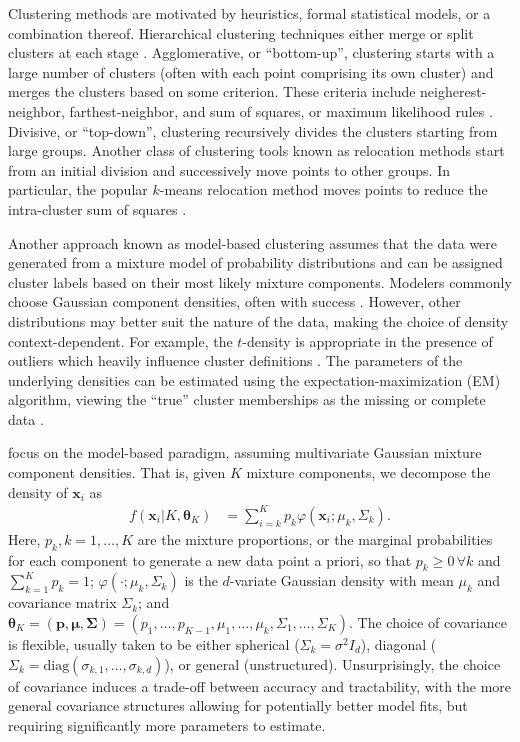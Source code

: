 \documentclass{uwstat572}
\newcommand*\ba{\[ \begin{aligned}}
\newcommand*\ea{\end{aligned} \]}
\newcommand*\bp{\mathbf{p}}
\newcommand*\bx{\mathbf{x}}
\newcommand*\btheta{\boldsymbol{\theta}}
\newcommand*\bmu{\boldsymbol{\mu}}
\newcommand*\bSigma{\boldsymbol{\Sigma}}
\renewcommand\;{\,}
\renewcommand\phi{\varphi}
\begin{document}
Clustering methods are motivated by heuristics, formal statistical models, or a combination thereof.
Hierarchical clustering techniques either merge or split clusters at each stage \citep{Fraley98}.
Agglomerative, or ``bottom-up'', clustering starts with a large number of clusters (often with each point comprising its own cluster) and merges the clusters based on some criterion.
These criteria include neigherest-neighbor, farthest-neighbor, and sum of squares, or maximum likelihood rules \citep{Kaufman90, Murtagh84, Banfield93}.
Divisive, or ``top-down'', clustering recursively divides the clusters starting from large groups. 
Another class of clustering tools known as relocation methods start from an initial division and successively move points to other groups.
In particular, the popular $k$-means relocation method moves points to reduce the intra-cluster sum of squares \citep{Hartigan78}. 



Another approach known as model-based clustering assumes that the data were generated from a mixture model of probability distributions and can be assigned cluster labels based on their most likely mixture components.
Modelers commonly choose Gaussian component densities, often with success \citep{Murtagh84, Banfield93, Dasgupta98, Campbell97, Celeux95, Mukerjee98}.
However, other distributions may better suit the nature of the data, making the choice of density context-dependent.
For example, the $t$-density is appropriate in the presence of outliers which heavily influence cluster definitions \citep{Peel00}.
The parameters of the underlying densities can be estimated using the expectation-maximization (EM) algorithm, viewing the ``true'' cluster memberships as the missing or complete data \citep{McLachlan88, Dempster77}. 


\cite{Baudry10} focus on the model-based paradigm, assuming multivariate Gaussian mixture component densities. 
That is, given $K$ mixture components, we decompose the density of $\bx_i$ as
\ba
f(\bx_i | K, \btheta_K)
	& = \sum_{i=k}^K p_k \phi \left(\bx_i ; \mu_k, \Sigma_k \right).
\ea
Here, $p_k, k = 1, \dotsc, K$ are the mixture proportions, or the marginal probabilities for each component to generate a new data point a priori, so that $p_k \ge 0 \; \forall k$ and $\sum_{k=1}^K p_k = 1$; $\phi(\cdot; \mu_k, \Sigma_k)$ is the $d$-variate Gaussian density with mean $\mu_k$ and covariance matrix $\Sigma_k$; and $\btheta_K = (\bp, \bmu, \bSigma) = (p_1, \dotsc, p_{K - 1}, \mu_1, \dotsc, \mu_k, \Sigma_1, \dotsc, \Sigma_K)$.
The choice of covariance is flexible, usually taken to be either spherical ($\Sigma_k = \sigma^2 I_d$), diagonal ($\Sigma_k = \text{diag}(\sigma_{k,1}, \dotsc, \sigma_{k,d})$), or general (unstructured).
Unsurprisingly, the choice of covariance induces a trade-off between accuracy and tractability, with the more general covariance structures allowing for potentially better model fits, but requiring significantly more parameters to estimate.
\end{document}

